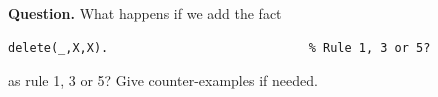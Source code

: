 \noindent\textbf{Question.} What happens if we add the fact
{\small
\begin{verbatim}
delete(_,X,X).                            % Rule 1, 3 or 5?
\end{verbatim}
}
    \noindent as rule 1, 3 or 5? Give counter-examples if needed.

